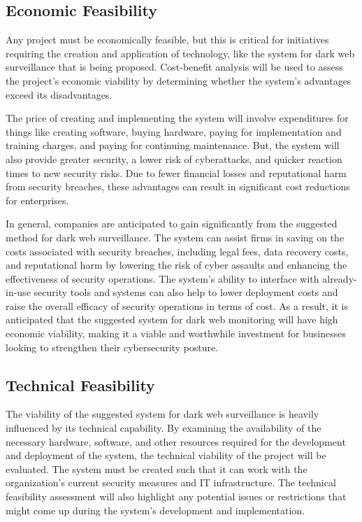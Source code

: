 \documentclass[10pt]{report}
\begin{document}
\subsection{Economic Feasibility}
Any project must be economically feasible, but this is critical for initiatives requiring the creation and application of technology, like the system for dark web surveillance that is being proposed. Cost-benefit analysis will be used to assess the project's economic viability by determining whether the system's advantages exceed its disadvantages.

The price of creating and implementing the system will involve expenditures for things like creating software, buying hardware, paying for implementation and training charges, and paying for continuing maintenance. But, the system will also provide greater security, a lower risk of cyberattacks, and quicker reaction times to new security risks. Due to fewer financial losses and reputational harm from security breaches, these advantages can result in significant cost reductions for enterprises.

In general, companies are anticipated to gain significantly from the suggested method for dark web surveillance. The system can assist firms in saving on the costs associated with security breaches, including legal fees, data recovery costs, and reputational harm by lowering the risk of cyber assaults and enhancing the effectiveness of security operations. The system's ability to interface with already-in-use security tools and systems can also help to lower deployment costs and raise the overall efficacy of security operations in terms of cost. As a result, it is anticipated that the suggested system for dark web monitoring will have high economic viability, making it a viable and worthwhile investment for businesses looking to strengthen their cybersecurity posture.

\subsection{Technical Feasibility}
The viability of the suggested system for dark web surveillance is heavily influenced by its technical capability. By examining the availability of the necessary hardware, software, and other resources required for the development and deployment of the system, the technical viability of the project will be evaluated. The system must be created such that it can work with the organization's current security measures and IT infrastructure. The technical feasibility assessment will also highlight any potential issues or restrictions that might come up during the system's development and implementation.
\end{document}
